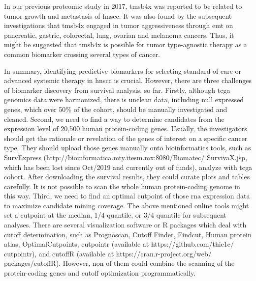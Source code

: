 \documentclass[cancers,article,submit,moreauthors,pdftex]{Definitions/mdpi}
\begin{document}
In our previous proteomic study in 2017, \acrfull{tmsb4x} was reported to be related to tumor growth and metastasis of \acrshort{hnscc}\cite{Chi2017}. It was also found by the subsequent investigations that \acrshort{tmsb4x} engaged in tumor aggressiveness through \acrfull{emt} on pancreatic\cite{Zhang2008}, gastric\cite{Ryu2012}, colorectal\cite{Gemoll2015}, lung\cite{Huang2016}, ovarian\cite{Chu2019} and melanoma\cite{Makowiecka2019} cancers. Thus, it might be suggested that \acrshort{tmsb4x}  is possible for tumor type-agnostic therapy\cite{Yan2018} as a common biomarker crossing several types of cancer.

In summary, identifying predictive biomarkers for selecting standard-of-care or advanced systemic therapy\cite{Cristina2019} in \acrshort{hnscc} is crucial. 
However, there are three challenges of biomarker discovery from survival analysis, so far.
Firstly, although \acrshort{tcga} genomics data were harmonized, there is unclean data, including null expressed genes, which over 50\% of the cohort, should be manually investigated and cleaned.
Second, we need to find a way to determine candidates from the expression level of 20,500 human protein-coding genes\cite{Clamp2007}. Usually, the investigators should get the rationale or revelation of the genes of interest on a specific cancer type. They should upload those genes manually onto bioinformatics tools, such as SurvExpress (http://bioinformatica.mty.itesm.mx:8080/Biomatec/ \newline
SurvivaX.jsp, which has been lost since Oct/2019 and currently out of funds), analyze with \acrshort{tcga} cohort. After downloading the survival results, they could curate plots and tables carefully.
It is not possible to scan the whole human protein-coding genome in this way.
Third, we need to find an optimal cutpoint of those \acrshort{rna} expression data to maximize candidate mining coverage. The above mentioned online tools might set a cutpoint at the median, 1/4 quantile, or 3/4 quantile for subsequent analyses. There are several visualization software or R packages which deal with cutoff determination, such as Prognoscan\cite{Mizuno2009a}, Cutoff Finder\cite{Budczies2012}, Findcut\cite{Chang2017a}, Human protein atlas\cite{Uhlen2017}, OptimalCutpoints\cite{Cristina2019},  cutpointr (available at https://github.com/thie1e/ \newline
cutpointr), and cutoffR (available at https://cran.r-project.org/web/
packages/cutoffR). However, non of them could combine the scanning of the protein-coding genes and cutoff optimization programmatically.
\end{document}
